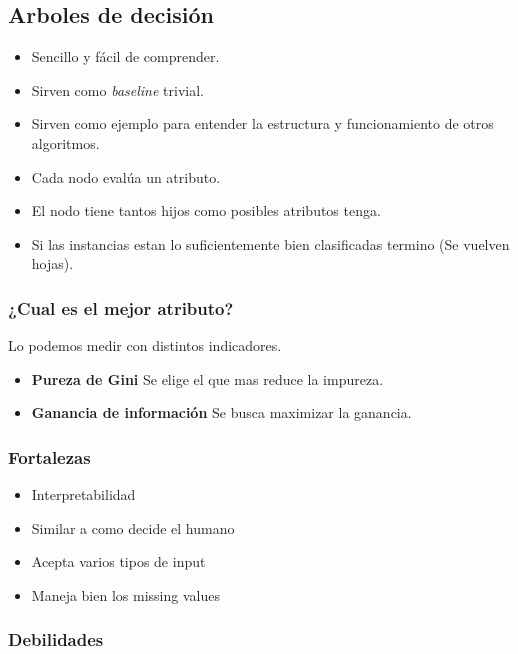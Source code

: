 \documentclass[titlepage,a4paper]{article}
\begin{document}
\subsection{Arboles de decisión}
\begin{itemize}
    \item Sencillo y fácil de comprender.
    \item Sirven como \textit{baseline} trivial.
    \item Sirven como ejemplo para entender la estructura y funcionamiento de otros algoritmos.
    \item Cada nodo evalúa un atributo.
    \item El nodo tiene tantos hijos como posibles atributos tenga.
    \item Si las instancias estan lo suficientemente bien clasificadas termino (Se vuelven hojas).
\end{itemize}

\subsubsection*{¿Cual es el mejor atributo?}
Lo podemos medir con distintos indicadores.
\begin{itemize}
    \item \textbf{Pureza de Gini} Se elige el que mas reduce la impureza. %
    \item \textbf{Ganancia de información} Se busca maximizar la ganancia. %
\end{itemize}


\subsubsection*{Fortalezas}

\begin{itemize}
    \item Interpretabilidad
    \item Similar a como decide el humano
    \item Acepta varios tipos de input
    \item Maneja bien  los missing values
\end{itemize}

\subsubsection*{Debilidades}
\end{document}
